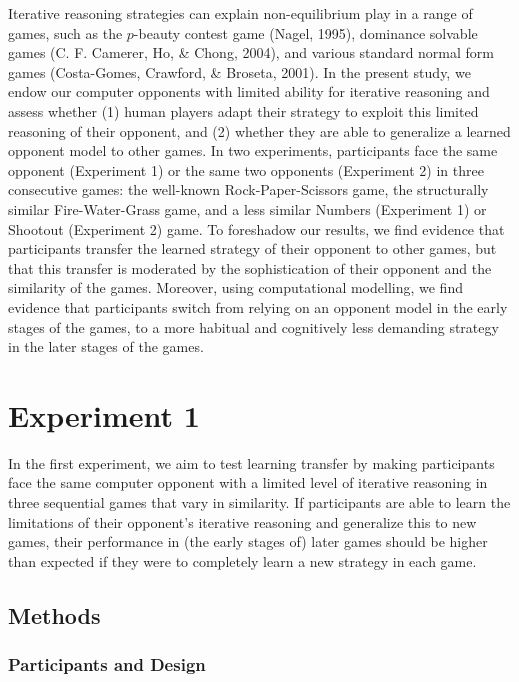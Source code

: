 \documentclass[
  english,
  man,floatsintext]{apa6}
\begin{document}
Iterative reasoning strategies can explain non-equilibrium play in a range of games, such as the \(p\)-beauty contest game (Nagel, 1995), dominance solvable games (C. F. Camerer, Ho, \& Chong, 2004), and various standard normal form games (Costa-Gomes, Crawford, \& Broseta, 2001). In the present study, we endow our computer opponents with limited ability for iterative reasoning and assess whether (1) human players adapt their strategy to exploit this limited reasoning of their opponent, and (2) whether they are able to generalize a learned opponent model to other games. In two experiments, participants face the same opponent (Experiment 1) or the same two opponents (Experiment 2) in three consecutive games: the well-known Rock-Paper-Scissors game, the structurally similar Fire-Water-Grass game, and a less similar Numbers (Experiment 1) or Shootout (Experiment 2) game. To foreshadow our results, we find evidence that participants transfer the learned strategy of their opponent to other games, but that this transfer is moderated by the sophistication of their opponent and the similarity of the games. Moreover, using computational modelling, we find evidence that participants switch from relying on an opponent model in the early stages of the games, to a more habitual and cognitively less demanding strategy in the later stages of the games.

\hypertarget{experiment-1}{%
\section{Experiment 1}\label{experiment-1}}

In the first experiment, we aim to test learning transfer by making participants face the same computer opponent with a limited level of iterative reasoning in three sequential games that vary in similarity. If participants are able to learn the limitations of their opponent's iterative reasoning and generalize this to new games, their performance in (the early stages of) later games should be higher than expected if they were to completely learn a new strategy in each game.

\hypertarget{methods}{%
\subsection{Methods}\label{methods}}

\hypertarget{participants-and-design}{%
\subsubsection{Participants and Design}\label{participants-and-design}}
\end{document}
